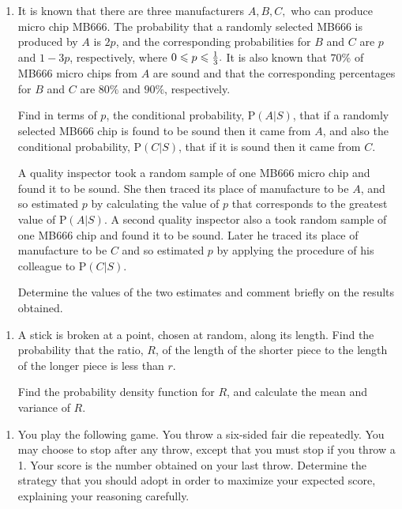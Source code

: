 \documentclass[a4, 11pt]{report}
\newlength{\qspace}
\newcounter{qnumber}
\newenvironment{question}%
 {\vspace{\qspace}
  \begin{enumerate}[\bfseries 1\quad][10]%
    \setcounter{enumi}{\value{qnumber}}%
    \item%
 }
{
  \end{enumerate}
  \filbreak
  \stepcounter{qnumber}
 }
\def\P{{\mathrm P}}
\def\le{\leqslant}
\begin{document}
\begin{question}
It is known  that there are
three manufacturers $A, B, C,$ who can  produce
micro chip MB666. The probability that a randomly selected MB666
is produced by $A$ is $2p$, and the corresponding probabilities for
$B$ and $C$ are $p$ and $1 - 3p$, respectively, where 
${{0} \le p \le {1 \over 3}}.$ It is also known that $70\%$ of 
MB666 micro chips from $A$ are sound  and that the corresponding
percentages for $B$ and $C$ are  $80\%$ and $90\%$, respectively. 

Find in terms of $p$, the conditional probability, $\P(A {\vert} S)$,
that if a randomly selected 
MB666 chip is found to be sound then it came from $A$, and also the 
conditional probability, $\P(C {\vert} S)$, that  
if it is sound then it came from $C$.

A quality inspector took a random sample 
of one MB666 micro chip and found it to be sound. She then traced
its place of manufacture to be $A$, and 
so estimated $p$ by calculating the value of $p$ 
that corresponds to the  greatest value 
of  $\P(A {\vert} S)$. A second quality 
inspector also a took random sample of one MB666 chip and 
found it to be sound. Later he traced its place of manufacture
to be $C$ and so estimated $p$ by applying the procedure of his
colleague to $\P(C {\vert} S)$.

Determine the values of the two estimates and comment 
briefly on the results obtained.

\end{question}

\begin{question}
A stick is broken at a point, chosen at random, along its length.
Find the probability that the ratio, $R$, of the length of the shorter
piece to the length of the longer piece is less than $r$.

Find the probability density  function for $R$, and calculate the  mean and 
variance of $R$.
\end{question}

\begin{question}
You play the following game. You throw a six-sided fair die repeatedly.
You may choose to stop after any throw, except that 
you must stop if you throw a 1. Your score is the
number obtained on your last throw.
Determine  the strategy that you should adopt in order 
 to maximize your expected score, explaining your reasoning carefully.
\end{question}
	
\end{document}
